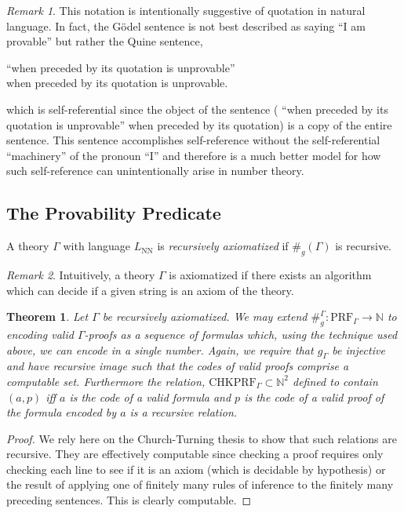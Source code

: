 \documentclass[12pt, leqno]{article}
\newcommand{\N}{\mathbb{N}}
\newcommand{\PRF}[1]{\mathrm{PRF}_{#1}}
\newenvironment{definition}[1][Definition:]{\begin{trivlist}
\item[\hskip \labelsep {\bfseries #1}]}{\end{trivlist}}
\theoremstyle{theorem}
\newtheorem{theorem}{Theorem}[section]
\theoremstyle{definition}
\theoremstyle{definition}
\theoremstyle{remark}
\theoremstyle{definition}
\theoremstyle{remark}
\newtheorem{remark}{Remark}[subsection]
\newcommand{\Gnum}[1]{\#_g\left( #1 \right)}
\begin{document}
\begin{remark}
This notation is intentionally suggestive of quotation in natural language. In fact, the G\"{o}del sentence is not best described as saying ``I am provable'' but rather the Quine sentence,
\begin{center}
``when preceded by its quotation is unprovable'' \\
when preceded by its quotation is unprovable.
\end{center}
which is self-referential since the object of the sentence ( ``when preceded by its quotation is unprovable'' when preceded by its quotation) is a copy of the entire sentence. This sentence accomplishes self-reference without the self-referential ``machinery'' of the pronoun ``I'' and therefore is a much better model for how such self-reference can unintentionally arise in number theory. 
\end{remark}

\subsection{The Provability Predicate}

\begin{definition}
A theory $\Gamma$ with language $L_{\text{NN}}$ is \textit{recursively axiomatized} if $\Gnum{\Gamma}$ is recursive. 
\end{definition}

\begin{remark}
Intuitively, a theory $\Gamma$ is axiomatized if there exists an algorithm which can decide if a given string is an axiom of the theory. 
\end{remark}

\newcommand{\CHKPRF}{\mathrm{CHKPRF}}

\begin{theorem}
Let $\Gamma$ be recursively axiomatized. We may extend $\#_g^\Gamma : \PRF{\Gamma} \to \N$ to encoding valid $\Gamma$-proofs as a sequence of formulas which, using the technique used above, we can encode in a single number. Again, we require that $g_{\Gamma}$ be injective and have recursive image such that the codes of valid proofs comprise a computable set. Furthermore the relation, $\CHKPRF_{\Gamma} \subset \N^2$ defined to contain $(a, p)$ iff $a$ is the code of a valid formula and $p$ is the code of a valid proof of the formula encoded by $a$ is a recursive relation. 
\end{theorem}

\begin{proof}
We rely here on the Church-Turning thesis to show that such relations are recursive. They are effectively computable since checking a proof requires only checking each line to see if it is an axiom (which is decidable by hypothesis) or the result of applying one of finitely many rules of inference to the finitely many preceding sentences. This is clearly computable. 
\end{proof}
\end{document}
